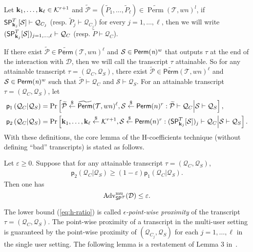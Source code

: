 Let $\mathbf{k}_1, \ldots ,\mathbf{k}_{\ell} \in \mathcal{K}^{r+1}$ and $\widetilde{\mathcal{P}} = (\widetilde{P}_1, \ldots ,\widetilde{P}_\ell) \in \widetilde{\operatorname{Perm}}(\mathcal{T},wn)^l$, if $\mathsf{SP}_{\mathbf{k}_j}^T[\mathcal{S}]\vdash\mathcal{Q}_{C_j}$ (resp. $\widetilde{P}_j\vdash\mathcal{Q}_{C_j}$) for every $j = 1, \ldots ,\ell$, then we will write $(\mathsf{SP}_{\mathbf{k}_j}^{T}[\mathcal{S}])_{j = 1, \ldots ,\ell} \vdash \mathcal{Q}_C$ (resp. $\widetilde{P}\vdash\mathcal{Q}_{C}$).


If there exist $\widetilde{\mathcal{P}} \in \widetilde{\mathsf{Perm}}(\mathcal{T},w n)^\ell$ and $\mathcal{S} \in \mathsf{Perm}(\emph{n})^w$ that outputs $\tau$ at the end of the interaction with $\mathcal{D}$, then we will call the transcript $\tau$ attainable. So for any attainable transcript $\tau= (\mathcal{Q}_C,\mathcal{Q}_S)$, there exist $\widetilde{\mathcal{P}} \in \widetilde{\mathsf{Perm}}(\mathcal{T},w n)^\ell$ and $\mathcal{S} \in \mathsf{Perm}(\emph{n})^w$ such that $\widetilde{\mathcal{P}}\vdash\mathcal{Q}_C$ and $\mathcal{S}\vdash\mathcal{Q}_S$. For an attainable transcript $\tau = (\mathcal{Q}_C,\mathcal{Q}_S)$, let
%
%
$$
\begin{aligned}
&\mathsf{p}_{1}\left(\mathcal{Q}_{C} | \mathcal{Q}_{S}\right)=\operatorname{Pr}\left[\widetilde{\mathcal{P}} \stackrel{\$}{\leftarrow} \widetilde{{\mathsf{Perm}}}(\mathcal{T}, w n)^{\ell}, \mathcal{S} \stackrel{\$}{\leftarrow} \mathsf{Perm}(n)^{r}: \widetilde{\mathcal{P}} \vdash \mathcal{Q}_{C} \Big| \mathcal{S} \vdash \mathcal{Q}_{S}\right],\\
&\mathsf{p}_{2}\left(\mathcal{Q}_{C} | \mathcal{Q}_{S}\right)=\operatorname{Pr}\left[\mathbf{k}_{1}, \ldots, \mathbf{k}_{\ell} \stackrel{\$}{\leftarrow} \mathcal{K}^{r+1}, \mathcal{S} \stackrel{\$}{\leftarrow} \mathsf{Perm}(n)^{r}:(\mathsf{SP}_{\mathbf{k}_{j}}^{T}[\mathcal{S}])_{j} \vdash \mathcal{Q}_{C} \Big| \mathcal{S} \vdash \mathcal{Q}_{S}\right].
\end{aligned}
$$
%
%
With these definitions, the core lemma of the H-coefficients technique (without defining ``bad'' transcripts) is stated as follows.


\begin{lemma}
	\label{lemma:h-coeff}
	
	Let $\varepsilon \geq 0$. Suppose that for any attainable transcript $\tau = (\mathcal{Q}_C,\mathcal{Q}_S)$,
	\begin{align}
	\mathsf{p}_{2}\left(\mathcal{Q}_{C} | \mathcal{Q}_{S}\right) \geq (1 - \varepsilon) \mathsf{p}_{1}\left(\mathcal{Q}_{C} | \mathcal{Q}_{S}\right).
	\label{eq:h-ratio}
	\end{align}
	Then one has
	$$
	\operatorname{Adv}^{\mathrm{mu}}_{\mathsf{SP}^T}(\mathcal{D}) \leq \varepsilon.
	$$
\end{lemma}
%
%
The lower bound (\ref{eq:h-ratio}) is called \emph{$\epsilon$-point-wise proximity} of the transcript $\tau = (\mathcal{Q}_C, \mathcal{Q}_S)$. The point-wise proximity of a transcript in the multi-user setting is guaranteed by the point-wise proximity of $(\mathcal{Q}_{C_{j}}, \mathcal{Q}_S)$ for each $j = 1, \ldots ,\ell$ in the single user setting. The following lemma is a restatement of Lemma 3  in~\cite{C:HoaTes16}.


